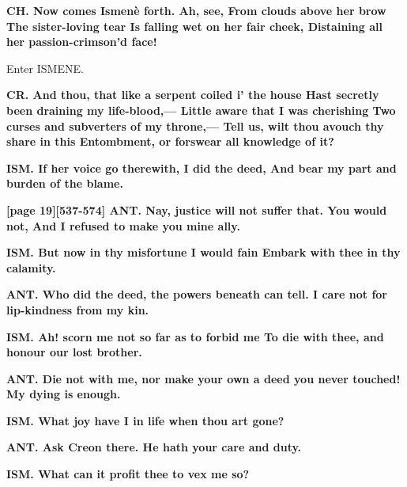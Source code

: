 \documentclass[11pt,letter]{book}
\begin{document}
\par \textbf{CH. Now comes Ismenè forth. Ah, see, From clouds above her brow The sister-loving tear Is falling wet on her fair cheek, Distaining all her passion-crimson’d face!}
\par 

\par  Enter ISMENE.

\par \textbf{CR. And thou, that like a serpent coiled i’ the house Hast secretly been draining my life-blood,— Little aware that I was cherishing Two curses and subverters of my throne,— Tell us, wilt thou avouch thy share in this Entombment, or forswear all knowledge of it?}
\par 

\par \textbf{ISM. If her voice go therewith, I did the deed, And bear my part and burden of the blame.}
\par 

\par \textbf{[page 19][537-574] ANT. Nay, justice will not suffer that. You would not, And I refused to make you mine ally.}
\par 

\par \textbf{ISM. But now in thy misfortune I would fain Embark with thee in thy calamity.}
\par 

\par \textbf{ANT. Who did the deed, the powers beneath can tell. I care not for lip-kindness from my kin.}
\par 

\par \textbf{ISM. Ah! scorn me not so far as to forbid me To die with thee, and honour our lost brother.}
\par 

\par \textbf{ANT. Die not with me, nor make your own a deed you never touched! My dying is enough.}
\par 

\par \textbf{ISM. What joy have I in life when thou art gone?}
\par 

\par \textbf{ANT. Ask Creon there. He hath your care and duty.}
\par 

\par \textbf{ISM. What can it profit thee to vex me so?}
\par 
\end{document}

